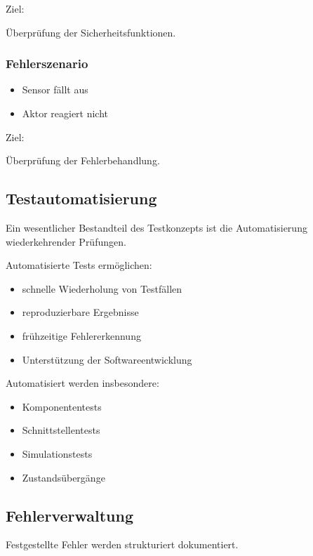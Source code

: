 \documentclass[
  a4paper,
  12pt,
  DIV=12,        %
  parskip=half,  %
  headings=small %
]{scrartcl}
\theoremstyle{definition}
\providecommand{\tightlist}{%
  \setlength{\itemsep}{0pt}\setlength{\parskip}{0pt}}
\theoremstyle{definition}
\begin{document}
Ziel:

Überprüfung der Sicherheitsfunktionen.

\subsubsection{Fehlerszenario}\label{fehlerszenario}

\begin{itemize}
\tightlist
\item
  Sensor fällt aus
\item
  Aktor reagiert nicht
\end{itemize}

Ziel:

Überprüfung der Fehlerbehandlung.

\subsection{Testautomatisierung}\label{testautomatisierung}

Ein wesentlicher Bestandteil des Testkonzepts ist die Automatisierung
wiederkehrender Prüfungen.

Automatisierte Tests ermöglichen:

\begin{itemize}
\tightlist
\item
  schnelle Wiederholung von Testfällen
\item
  reproduzierbare Ergebnisse
\item
  frühzeitige Fehlererkennung
\item
  Unterstützung der Softwareentwicklung
\end{itemize}

Automatisiert werden insbesondere:

\begin{itemize}
\tightlist
\item
  Komponententests
\item
  Schnittstellentests
\item
  Simulationstests
\item
  Zustandsübergänge
\end{itemize}

\subsection{Fehlerverwaltung}\label{fehlerverwaltung}

Festgestellte Fehler werden strukturiert dokumentiert.
\end{document}

